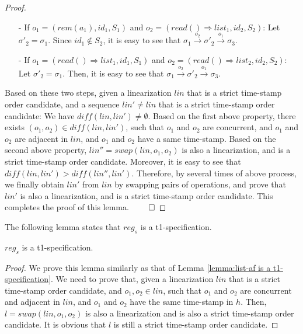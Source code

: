{\begin {proof}
\begin{itemize}
\begin{itemize}
    \item[-] If $o_1 = (\mathit{rem}(a_1),\mathit{id}_1,S_1)$ and $o_2 = (\mathit{read}() \Rightarrow \mathit{list}_1,\mathit{id}_2,S_2)$: Let $\sigma'_2 = \sigma_1$. Since $\mathit{id}_1 \notin S_2$, it is easy to see that $\sigma_1 {\xrightarrow{o_2}} \sigma'_2 {\xrightarrow{o_1}} \sigma_3$.

    \item[-] If $o_1 = (\mathit{read}() \Rightarrow \mathit{list}_1,\mathit{id}_1,S_1)$ and $o_2 = (\mathit{read}() \Rightarrow \mathit{list}_2,\mathit{id}_2,S_2)$: Let $\sigma'_2 = \sigma_1$. Then, it is easy to see that $\sigma_1 {\xrightarrow{o_2}} \sigma'_2 {\xrightarrow{o_1}} \sigma_3$.
    \end{itemize}
\end{itemize}

Based on these two steps, given a linearization $\mathit{lin}$ that is a strict time-stamp order candidate, and a sequence $\mathit{lin}' \neq \mathit{lin}$ that is a strict time-stamp order candidate: We have $\mathit{diff}(\mathit{lin},\mathit{lin}') \neq \emptyset$. Based on the first above property, there exists $(o_1,o_2) \in \mathit{diff}(\mathit{lin},\mathit{lin}')$, such that $o_1$ and $o_2$ are concurrent, and $o_1$ and $o_2$ are adjacent in $\mathit{lin}$, and $o_1$ and $o_2$ have a same time-stamp. Based on the second above property, $\mathit{lin}'' = \mathit{swap}(\mathit{lin},o_1,o_2)$ is also a linearization, and is a strict time-stamp order candidate. Moreover, it is easy to see that $\mathit{diff}(\mathit{lin},\mathit{lin}') > \mathit{diff}(\mathit{lin}'',\mathit{lin}')$. Therefore, by several times of above process, we finally obtain $\mathit{lin}'$ from $\mathit{lin}$ by swapping pairs of operations, and prove that $\mathit{lin}'$ is also a linearization, and is a strict time-stamp order candidate. This completes the proof of this lemma. $\qed$
\end {proof}


The following lemma states that $\mathit{reg}_s$ is a t1-specification.

\begin{lemma}
\label{lemma:reg is a t1-specification}
$\mathit{reg}_s$ is a t1-specification.
\end{lemma}

\begin {proof}

We prove this lemma similarly as that of Lemma \ref{lemma:list-af is a t1-specification}. We need to prove that, given a linearization $\mathit{lin}$ that is a strict time-stamp order candidate, and $o_1,o_2 \in \mathit{lin}$, such that $o_1$ and $o_2$ are concurrent and adjacent in $\mathit{lin}$, and $o_1$ and $o_2$ have the same time-stamp in $h$. Then, $l = \mathit{swap}(\mathit{lin},o_1,o_2)$ is also a linearization and is also a strict time-stamp order candidate. It is obvious that $l$ is still a strict time-stamp order candidate.


\end{proof}}
